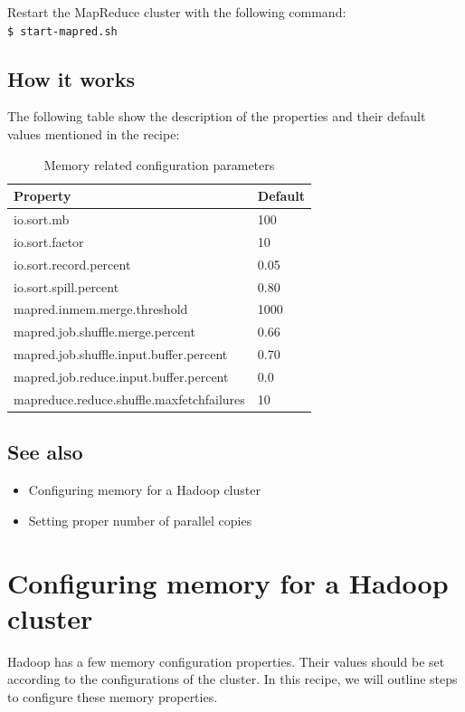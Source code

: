 Restart the MapReduce cluster with the following command: \\
\verb|$ start-mapred.sh|

\subsection*{How it works}
The following table show the description of the properties and their default values mentioned in the recipe: \\

\begin{table}[h]
  \centering
  \begin{tabular}{ll}
    \toprule
    \textbf{Property} &  \textbf{Default} \\ \midrule
      io.sort.mb & 100 \\
      io.sort.factor & 10 \\
      io.sort.record.percent & 0.05 \\
      io.sort.spill.percent & 0.80 \\
      mapred.inmem.merge.threshold & 1000 \\
      mapred.job.shuffle.merge.percent & 0.66 \\
      mapred.job.shuffle.input.buffer.percent & 0.70 \\
      mapred.job.reduce.input.buffer.percent & 0.0 \\
      mapreduce.reduce.shuffle.maxfetchfailures & 10  \\ \bottomrule
  \end{tabular}
  \caption{Memory related configuration parameters}\label{tbl:memoryconfig}
\end{table}

\subsection*{See also}
\begin{itemize}
  \item Configuring memory for a Hadoop cluster
  \item Setting proper number of parallel copies
\end{itemize}
\section{Configuring memory for a Hadoop cluster}
Hadoop has a few memory configuration properties. Their values should be set according to the configurations of the cluster. In this recipe, we will outline steps to configure these memory properties.
